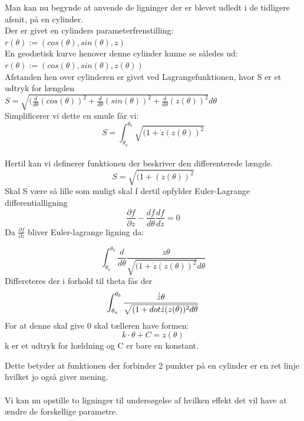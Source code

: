 \documentclass[12pt]{article}
\begin{document}
Man kan nu begynde at anvende de ligninger der er blevet udledt i de tidligere afsnit, på en cylinder.
\\
Der er givet en cylinders parameterfrenstilling:
\\
$r(\theta):=(cos(\theta),sin(\theta),z)$
\\
En geodætisk kurve henover denne cylinder kunne se således ud:
\\
$r(\theta):=(cos(\theta),sin(\theta),z(\theta))$
\\
Afstanden hen over cylinderen er givet ved Lagrangefunktionen, hvor S er et udtryk for længden
\\
$S = \sqrt{(\frac{d}{d\theta}(cos(\theta))^2+\frac{d}{d\theta}(sin(\theta))^2+\frac{d}{d\theta}(z(\theta))^2}d\theta$
\\
Simplificerer vi dette en smule får vi:
\begin{equation*}
S=\int_{\theta_a}^{\theta_b}\sqrt{(1+\dot{z}(z(\theta))^2}
\end{equation*}
\\
Hertil kan vi definerer funktionen der beskriver den differenterede længde.
\begin{equation*}
S=\sqrt{(1+(z(\theta))^2}
\end{equation*}
Skal S være så lille som muligt skal f dertil opfylder Euler-Lagrange differentialligning
\begin{equation}
\frac{\partial f}{\partial z}-\frac{d f}{d \theta} \frac{d f}{d\dot{z}}=0
\end{equation}
Da $\frac{\partial f}{\partial z}$ bliver Euler-lagrange ligning da:

\begin{equation}
\int_{\theta_a}^{\theta_b}\frac{d}{d\theta}\frac{\dot{z}\theta}{\sqrt{(1+\dot{z}(z(\theta))^2}d\theta}
\end{equation}
Differeteres der i forhold til theta fås der
\begin{equation}
\int_{\theta_a}^{\theta_b}\frac{\dot{\dot{z}}\theta}{\sqrt{(1+\\dot{\dot{z}(z(\theta))^2}d\theta}}
\end{equation}
For at denne skal give 0 skal tælleren have formen:
\begin{equation}
k\cdot \theta+C = z(\theta)
\end{equation}
k er et udtryk for hældning og C er bare en konstant.

Dette betyder at funktionen der forbinder 2 punkter på en cylinder er en ret linje hvilket jo også giver mening.
\\
\\
Vi kan nu opstille to ligninger til undersøgelse af hvilken effekt det vil have at ændre de forskellige parametre.
\end{document}
